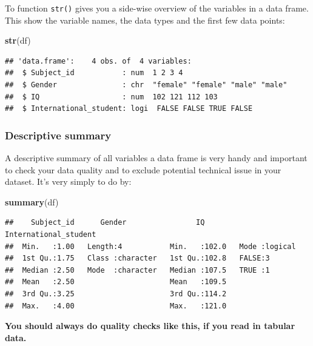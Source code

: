 \documentclass[
]{scrartcl}
\newenvironment{Shaded}{\begin{snugshade}}{\end{snugshade}}
\newcommand{\FunctionTok}[1]{\textcolor[rgb]{0.13,0.29,0.53}{\textbf{#1}}}
\newcommand{\NormalTok}[1]{#1}
\begin{document}
To function \texttt{str()} gives you a side-wise overview of the variables in a data frame. This show the variable names, the data types and the first few data points:

\begin{Shaded}
\begin{Highlighting}[]
\FunctionTok{str}\NormalTok{(df)}
\end{Highlighting}
\end{Shaded}

\begin{verbatim}
## 'data.frame':    4 obs. of  4 variables:
##  $ Subject_id           : num  1 2 3 4
##  $ Gender               : chr  "female" "female" "male" "male"
##  $ IQ                   : num  102 121 112 103
##  $ International_student: logi  FALSE FALSE TRUE FALSE
\end{verbatim}

\hypertarget{descriptive-summary}{%
\subsubsection*{Descriptive summary}\label{descriptive-summary}}

A descriptive summary of all variables a data frame is very handy and important to check your data quality and to exclude potential technical issue in your dataset. It's very simply to do by:

\begin{Shaded}
\begin{Highlighting}[]
\FunctionTok{summary}\NormalTok{(df)}
\end{Highlighting}
\end{Shaded}

\begin{verbatim}
##    Subject_id      Gender                IQ        International_student
##  Min.   :1.00   Length:4           Min.   :102.0   Mode :logical        
##  1st Qu.:1.75   Class :character   1st Qu.:102.8   FALSE:3              
##  Median :2.50   Mode  :character   Median :107.5   TRUE :1              
##  Mean   :2.50                      Mean   :109.5                        
##  3rd Qu.:3.25                      3rd Qu.:114.2                        
##  Max.   :4.00                      Max.   :121.0
\end{verbatim}

\textbf{You should always do quality checks like this, if you read in tabular data.}
\end{document}
